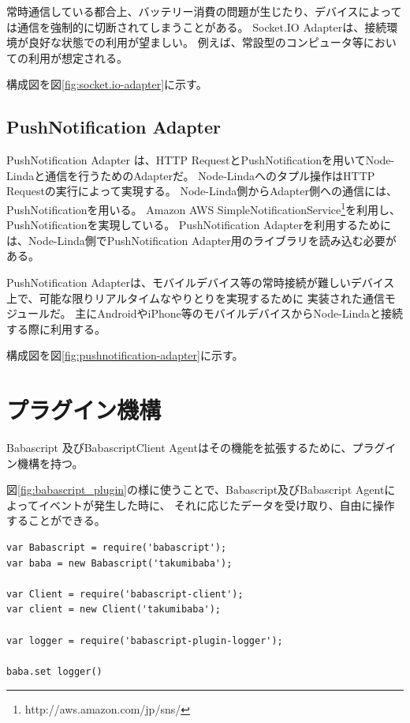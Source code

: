 常時通信している都合上、バッテリー消費の問題が生じたり、デバイスによっては通信を強制的に切断されてしまうことがある。
Socket.IO Adapterは、接続環境が良好な状態での利用が望ましい。
例えば、常設型のコンピュータ等においての利用が想定される。

構成図を図\ref{fig:socket.io-adapter}に示す。

\subsection{PushNotification Adapter}\label{pushnotification-adapter}

PushNotification Adapter は、HTTP
RequestとPushNotificationを用いてNode-Lindaと通信を行うためのAdapterだ。
Node-Lindaへのタプル操作はHTTP Requestの実行によって実現する。
Node-Linda側からAdapter側への通信には、PushNotificationを用いる。 Amazon
AWS
SimpleNotificationService\footnote{http://aws.amazon.com/jp/sns/}を利用し、
PushNotificationを実現している。 PushNotification
Adapterを利用するためには、Node-Linda側でPushNotification
Adapter用のライブラリを読み込む必要がある。

PushNotification
Adapterは、モバイルデバイス等の常時接続が難しいデバイス上で、可能な限りリアルタイムなやりとりを実現するために
実装された通信モジュールだ。
主にAndroidやiPhone等のモバイルデバイスからNode-Lindaと接続する際に利用する。

構成図を図\ref{fig:pushnotification-adapter}に示す。

\section{プラグイン機構}\label{ux30d7ux30e9ux30b0ux30a4ux30f3ux6a5fux69cb}

Babascript 及びBabascriptClient
Agentはその機能を拡張するために、プラグイン機構を持つ。

図\ref{fig:babascript_plugin}の様に使うことで、Babascript及びBabascript
Agentによってイベントが発生した時に、
それに応じたデータを受け取り、自由に操作することができる。

\begin{lstlisting}[caption=Babascript Plugin, label=code:babascriptux5fplugin]
var Babascript = require('babascript');
var baba = new Babascript('takumibaba');

var Client = require('babascript-client');
var client = new Client('takumibaba');

var logger = require('babascript-plugin-logger');

baba.set logger()
\end{lstlisting}

